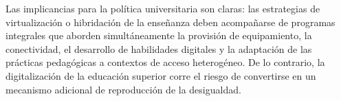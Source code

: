 Las implicancias para la política universitaria son claras: las estrategias de virtualización o hibridación de la enseñanza deben acompañarse de programas integrales que aborden simultáneamente la provisión de equipamiento, la conectividad, el desarrollo de habilidades digitales y la adaptación de las prácticas pedagógicas a contextos de acceso heterogéneo. De lo contrario, la digitalización de la educación superior corre el riesgo de convertirse en un mecanismo adicional de reproducción de la desigualdad.


